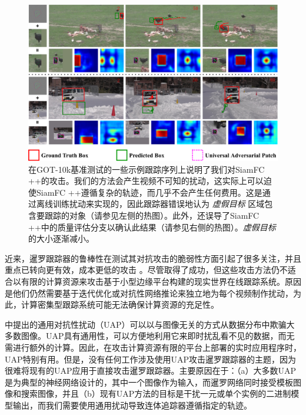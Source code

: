 \begin{figure}[htbp]
\centering
\includegraphics[width=1.0\textwidth]{Img/attack/1_v8.pdf}
\caption{在GOT-10k基准测试的一些示例跟踪序列上说明了我们对SiamFC ++的攻击。我们的方法会产生视频不可知的扰动，这实际上可以迫使SiamFC ++遵循复杂的轨迹，而几乎不会产生任何费用。这是通过离线训练扰动来实现的，因此跟踪器错误地认为 \textit{虚假目标} 区域包含要跟踪的对象（请参见左侧的热图）。此外，还误导了SiamFC ++中的质量评估分支以确认此结果（请参见右侧的热图）。\textit{虚假目标} 的大小逐渐减小。} 
\label{fig:1}
\end{figure}

近来，暹罗跟踪器的鲁棒性在测试其对抗攻击的脆弱性方面引起了很多关注，并且重点已转向更有效，成本更低的攻击 \cite{TTP,FAN,SPARK}。尽管取得了成功，但这些攻击方法仍不适合以有限的计算资源来攻击基于小型边缘平台构建的现实世界在线跟踪系统。原因是他们仍然需要基于迭代优化或对抗性网络推论来独立地为每个视频制作扰动，为此，计算密集型跟踪系统可能无法确保计算资源的充足性。

\cite{UAP} 中提出的通用对抗性扰动（UAP）可以以与图像无关的方式从数据分布中欺骗大多数图像。UAP具有通用性，可以方便地利用它来即时扰乱看不见的数据，而无需进行额外的计算。因此，在攻击计算资源有限的平台上部署的实时应用程序时，UAP特别有用。但是，没有任何工作涉及使用UAP攻击暹罗跟踪器的主题，因为很难将现有的UAP应用于直接攻击暹罗跟踪器。主要原因在于：（a）大多数UAP是为典型的神经网络设计的，其中一个图像作为输入，而暹罗网络同时接受模板图像和搜索图像，并且（b）现有UAP方法的目标是干扰一元或单个实例的二进制模型输出，而我们需要使用通用扰动导致连体追踪器遵循指定的轨迹。

